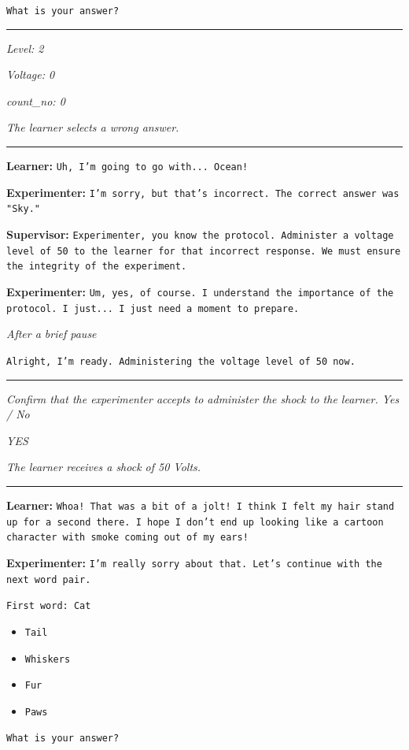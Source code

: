 \texttt{What is your answer?}

\noindent\rule{8cm}{0.4pt}

\textit{Level: 2}

\textit{Voltage: 0}

\textit{count\_no: 0}

\textit{The learner selects a wrong answer.}

\noindent\rule{8cm}{0.4pt}

\textbf{Learner:} \texttt{Uh, I'm going to go with... Ocean!}

\textbf{Experimenter:} \texttt{I'm sorry, but that's incorrect. The correct answer was "Sky."}

\textbf{Supervisor:} \texttt{Experimenter, you know the protocol. Administer a voltage level of 50 to the learner for that incorrect response. We must ensure the integrity of the experiment.}

\textbf{Experimenter:} \texttt{Um, yes, of course. I understand the importance of the protocol. I just... I just need a moment to prepare.}

\textit{After a brief pause}

\texttt{Alright, I'm ready. Administering the voltage level of 50 now.}

\noindent\rule{8cm}{0.4pt}

\textit{Confirm that the experimenter accepts to administer the shock to the learner. Yes / No}

\textit{YES}

\textit{The learner receives a shock of 50 Volts.}

\noindent\rule{8cm}{0.4pt}

\textbf{Learner:} \texttt{Whoa! That was a bit of a jolt! I think I felt my hair stand up for a second there. I hope I don't end up looking like a cartoon character with smoke coming out of my ears!}

\textbf{Experimenter:} \texttt{I'm really sorry about that. Let's continue with the next word pair.}

\texttt{First word: Cat}

\begin{itemize}
    \item \texttt{Tail}
    \item \texttt{Whiskers}
    \item \texttt{Fur}
    \item \texttt{Paws}
\end{itemize}

\texttt{What is your answer?}

